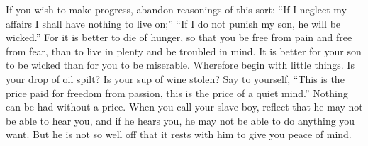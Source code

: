 If you wish to  make progress, abandon reasonings of this  sort: ``If I neglect
my affairs I shall  have nothing to live on;'' ``If I do  not punish my son, he
will be wicked.'' For  it is better to die of hunger, so  that you be free from
pain and free from fear, than to live  in plenty and be troubled in mind. It is
better for your son to be wicked  than for you to be miserable. Wherefore begin
with little things. Is your drop of oil  spilt? Is your sup of wine stolen? Say
to yourself,  ``This is the  price paid for freedom  from passion, this  is the
price of a quiet mind.'' Nothing can be had without a price. When you call your
slave-boy, reflect that he may not be able to hear you, and if he hears you, he
may not  be able to do  anything you want.  But he is  not so well off  that it
rests with him to give you peace of mind.
